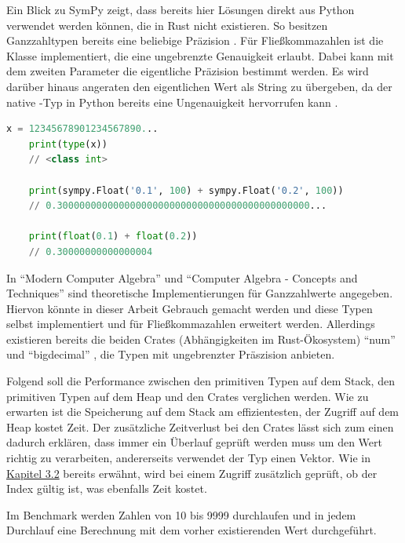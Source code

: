 \documentclass[11pt,a4paper, ngerman]{article}
\begin{document}
Ein Blick zu SymPy zeigt, dass bereits hier Lösungen direkt aus Python verwendet werden können, die in Rust nicht existieren. So besitzen Ganzzahltypen bereits eine beliebige Präzision \cite{PythonDocuIntPrecision}. Für Fließkommazahlen ist die Klasse  implementiert, die eine ungebrenzte Genauigkeit erlaubt. Dabei kann mit dem zweiten Parameter die eigentliche Präzision bestimmt werden. Es wird darüber hinaus angeraten den eigentlichen Wert als String zu übergeben, da der native -Typ in Python bereits eine Ungenauigkeit hervorrufen kann \cite{SymPyFloat}.

\begin{lstlisting}[language=Python, caption={SymPy Präzision}]
    x = 12345678901234567890...
    print(type(x))
    // <class int>

    print(sympy.Float('0.1', 100) + sympy.Float('0.2', 100))
    // 0.300000000000000000000000000000000000000000000...

    print(float(0.1) + float(0.2))
    // 0.30000000000000004
\end{lstlisting}

In ``Modern Computer Algebra'' \cite[S. 29 ff.]{Gathen2013} und ``Computer Algebra - Concepts and Techniques'' \cite[S. 81 ff.]{Lamagna2019} sind theoretische Implementierungen für Ganzzahlwerte angegeben. Hiervon könnte in dieser Arbeit Gebrauch gemacht werden und diese Typen selbst implementiert und für Fließkommazahlen erweitert werden. Allerdings existieren bereits die beiden Crates (Abhängigkeiten im Rust-Ökosystem) ``num'' \cite{CrateNum} und ``bigdecimal'' \cite{CrateBigdecimal}, die Typen mit ungebrenzter Präszision anbieten.

Folgend soll die Performance zwischen den primitiven Typen auf dem Stack, den primitiven Typen auf dem Heap und den Crates verglichen werden. Wie zu erwarten ist die Speicherung auf dem Stack am effizientesten, der Zugriff auf dem Heap kostet Zeit. Der zusätzliche Zeitverlust bei den Crates lässt sich zum einen dadurch erklären, dass immer ein Überlauf geprüft werden muss um den Wert richtig zu verarbeiten, andererseits verwendet der Typ  einen Vektor. Wie in \hyperref[sec:kap3d2]{Kapitel 3.2} bereits erwähnt, wird bei einem Zugriff zusätzlich geprüft, ob der Index gültig ist, was ebenfalls Zeit kostet.

Im Benchmark werden Zahlen von 10 bis 9999 durchlaufen und in jedem Durchlauf eine Berechnung mit dem vorher existierenden Wert durchgeführt.
\end{document}

